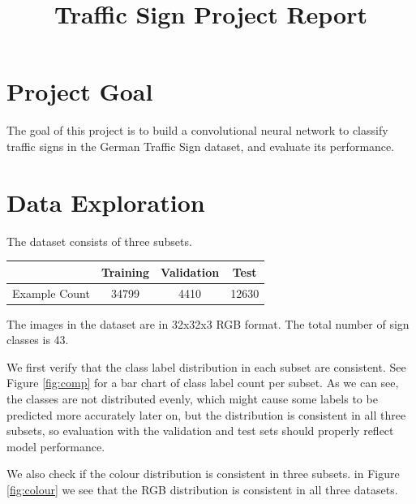 \documentclass[]{article}
\title{Traffic Sign Project Report}
\begin{document}
\maketitle

\section{Project Goal}
The goal of this project is to build a convolutional neural network to classify traffic signs in the German Traffic Sign dataset\cite{Stallkamp-IJCNN-2011}, and evaluate its performance.

\section{Data Exploration}
The dataset consists of three subsets.

\begin{center}
	\begin{tabular}{c | c | c | c}
		\hline
		& Training & Validation & Test \\ \hline
		Example Count & 34799 & 4410 & 12630 \\ \hline
	\end{tabular}
\end{center}

The images in the dataset are  in 32x32x3 RGB format. The total number of sign classes is 43.

We first verify that the class label distribution in each subset are consistent. See Figure \ref{fig:comp} for a bar chart of class label count per subset. As we can see, the classes are not distributed evenly, which might cause some labels to be predicted more accurately later on, but the distribution is consistent in all three subsets, so evaluation with the validation and test sets should properly reflect model performance.

We also check if the colour distribution is consistent in three subsets. in Figure \ref{fig:colour} we see that the RGB distribution is consistent in all three datasets.
\end{document}
